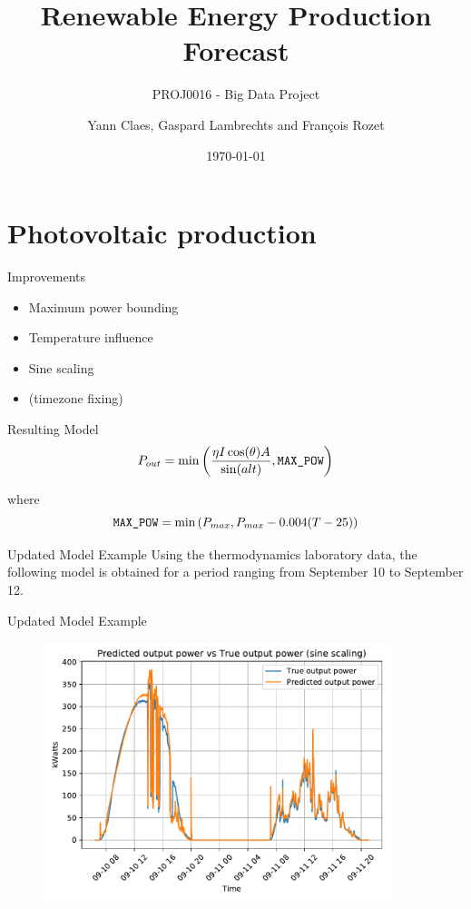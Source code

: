 \documentclass[12pt]{beamer}
\title{Renewable Energy Production Forecast}
\subtitle{PROJ0016 - Big Data Project}
\author{Yann Claes, Gaspard Lambrechts and François Rozet}
\institute{University of Liège}
\date{\today}
\begin{document}
\maketitle

\section{Photovoltaic production}

\begin{frame}{Improvements}
    \begin{itemize}
        \item Maximum power bounding
        \item Temperature influence
        \item Sine scaling
        \item (timezone fixing)
    \end{itemize}
\end{frame}

\begin{frame}{Resulting Model}
    \begin{equation*}
        P_{out} = \min\left(\frac{\eta I \cos(\theta) A}{\sin(alt)}, \texttt{MAX\_POW}\right)
    \end{equation*}
    
    where 
    \begin{equation*}
       \texttt{MAX\_POW} =  \min\left(P_{max}, P_{max} - 0.004 (T - 25)\right)
    \end{equation*}
\end{frame}

\begin{frame}{Updated Model Example}
    Using the thermodynamics laboratory data, the following model is obtained for a period ranging from September 10 to September 12.
\end{frame}

\begin{frame}{Updated Model Example}
    \begin{figure}
        \centering
        \includegraphics[width=0.9\textwidth]{resources/pdf/predicted_vs_true.pdf}
    \end{figure}
\end{frame}
\end{document}

